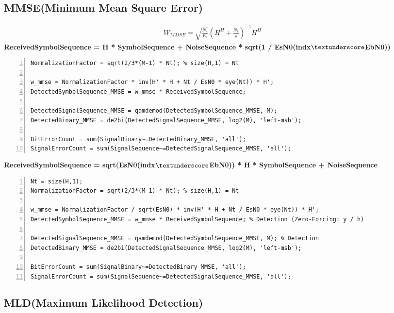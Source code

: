 \documentclass{article}
\newcommand{\bd}{\textbf} %
\begin{document}
\subsection{MMSE(Minimum Mean Square Error)}
\begin{gather}
	W_{MMSE}=\sqrt{\frac{N_t}{E_s}}(H^H+\frac{N_t}{\rho})^{-1}H^H
\end{gather}
\bd{ReceivedSymbolSequence = H * SymbolSequence + NoiseSequence * sqrt(1 / EsN0(indx$\textunderscore$EbN0))}
\begin{lstlisting}[style=Matlab-editor, frame=single, numbers=left,]
NormalizationFactor = sqrt(2/3*(M-1) * Nt); % size(H,1) = Nt

w_mmse = NormalizationFactor * inv(H' * H + Nt / EsN0 * eye(Nt)) * H';
DetectedSymbolSequence_MMSE = w_mmse * ReceivedSymbolSequence;

DetectedSignalSequence_MMSE = qamdemod(DetectedSymbolSequence_MMSE, M);
DetectedBinary_MMSE = de2bi(DetectedSignalSequence_MMSE, log2(M), 'left-msb');

BitErrorCount = sum(SignalBinary~=DetectedBinary_MMSE, 'all');
SignalErrorCount = sum(SignalSequence~=DetectedSignalSequence_MMSE, 'all');
\end{lstlisting}

\noindent\bd{ReceivedSymbolSequence = sqrt(EsN0(indx$\textunderscore$EbN0)) * H * SymbolSequence + NoiseSequence}
\begin{lstlisting}[style=Matlab-editor, frame=single, numbers=left,]
Nt = size(H,1);
NormalizationFactor = sqrt(2/3*(M-1) * Nt); % size(H,1) = Nt

w_mmse = NormalizationFactor / sqrt(EsN0) * inv(H' * H + Nt / EsN0 * eye(Nt)) * H';
DetectedSymbolSequence_MMSE = w_mmse * ReceivedSymbolSequence; % Detection (Zero-Forcing: y / h)

DetectedSignalSequence_MMSE = qamdemod(DetectedSymbolSequence_MMSE, M); % Detection
DetectedBinary_MMSE = de2bi(DetectedSignalSequence_MMSE, log2(M), 'left-msb');

BitErrorCount = sum(SignalBinary~=DetectedBinary_MMSE, 'all');
SignalErrorCount = sum(SignalSequence~=DetectedSignalSequence_MMSE, 'all');
\end{lstlisting}
\subsection{MLD(Maximum Likelihood Detection)}
\end{document}
